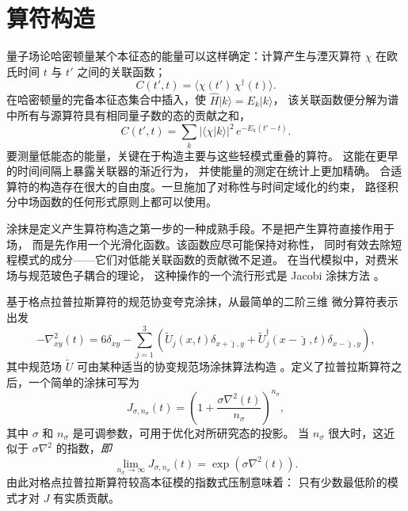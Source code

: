 \section{算符构造\label{sec:theory}}

量子场论哈密顿量某个本征态的能量可以这样确定：计算产生与湮灭算符
$\chi$ 在欧氏时间 $t$ 与 $t'$ 之间的关联函数；
\begin{equation}
   C(t',t)  = \Big\langle \chi(t')\,  \chi^\dagger(t) \Big\rangle.
\end{equation}
在哈密顿量的完备本征态集合中插入，使 $\hat{H} | k \rangle = E_k  | k\rangle$，
该关联函数便分解为谱中所有与源算符具有相同量子数的态的贡献之和，
\begin{equation}
   C(t',t)  = \sum_k \big|\langle \chi | k \rangle\big|^2 \, e^{-{E_k} (t'-t)}.
\end{equation}
要测量低能态的能量，关键在于构造主要与这些轻模式重叠的算符。
这能在更早的时间间隔上暴露关联器的渐近行为，
并使能量的测定在统计上更加精确。
合适算符的构造存在很大的自由度。一旦施加了对称性与时间定域化的约束，
路径积分中场函数的任何形式原则上都可以使用。

涂抹是定义产生算符构造之第一步的一种成熟手段。不是把产生算符直接作用于场，
而是先作用一个光滑化函数。该函数应尽可能保持对称性，
同时有效去除短程模式的成分——它们对低能关联函数的贡献微不足道。
在当代模拟中，对费米场与规范玻色子耦合的理论，
这种操作的一个流行形式是 Jacobi 涂抹方法 \cite{Allton:1993wc}。

基于格点拉普拉斯算符的规范协变夸克涂抹，从最简单的二阶三维
微分算符表示出发
\begin{equation}
   -\nabla^2_{xy}(t) = 6 \delta_{xy} - \sum_{j=1}^3
      \left(
	  \tilde{U}_j(x,t)         \delta_{x+\hat\jmath,y}
	 +\tilde{U}^\dagger_j(x-\hat\jmath,t) \delta_{x-\hat\jmath,y}
	  \right),
\end{equation}
其中规范场 $\tilde{U}$ 可由某种适当的协变规范场涂抹算法构造
\cite{Morningstar:2003gk}。定义了拉普拉斯算符之后，一个简单的涂抹可写为
\begin{equation}
  J_{\sigma, n_\sigma}(t) = \left( 1 + \frac{\sigma \nabla^2(t)}{n_\sigma} \right)^{n_\sigma},
  \label{eqn:smearing}
\end{equation}
其中 $\sigma$ 和 $n_\sigma$ 是可调参数，可用于优化对所研究态的投影。
当 $n_\sigma$ 很大时，这近似于 $\sigma\nabla^2$ 的指数，{\it 即}
\begin{equation}
  \lim_{n_\sigma\rightarrow\infty} J_{\sigma, n_\sigma}(t) = \exp\left(\sigma
      \nabla^2(t)\right).
\label{eqn:jacobi}
\end{equation}
由此对格点拉普拉斯算符较高本征模的指数式压制意味着：
只有少数最低阶的模式才对 $J$ 有实质贡献。

